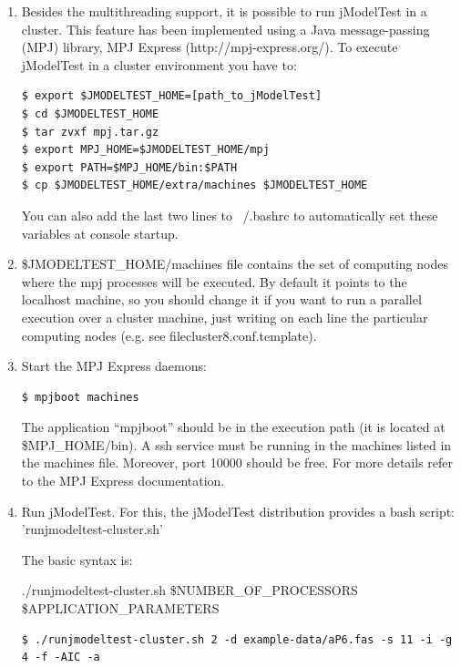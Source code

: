 \begin{enumerate}
\item Besides the multithreading support, it is possible to run jModelTest in a cluster. This feature has been implemented using a Java message-passing (MPJ) library, MPJ Express (http://mpj-express.org/). To execute jModelTest in a cluster environment you have to:

\begin{lstlisting}
$ export $JMODELTEST_HOME=[path_to_jModelTest]
$ cd $JMODELTEST_HOME
$ tar zvxf mpj.tar.gz
$ export MPJ_HOME=$JMODELTEST_HOME/mpj
$ export PATH=$MPJ_HOME/bin:$PATH
$ cp $JMODELTEST_HOME/extra/machines $JMODELTEST_HOME
\end{lstlisting}

You can also add the last two lines to ~/.bashrc to automatically set these variables at console startup.

\item \$JMODELTEST\_HOME/machines file contains the set of computing nodes where the mpj processes will be executed. By default it points to the localhost machine, so you should change it if you want to run a parallel execution over a cluster machine, just writing on each line the particular computing nodes (e.g. see filecluster8.conf.template).

\item Start the MPJ Express daemons:

\begin{lstlisting}
$ mpjboot machines
\end{lstlisting}

The application ``mpjboot'' should be in the execution path (it is located at \$MPJ\_HOME/bin). A ssh service must be running in the machines listed in the machines file. Moreover, port 10000 should be free. For more details refer to the MPJ Express documentation.

\item Run jModelTest. For this, the jModelTest distribution provides a bash script: 'runjmodeltest-cluster.sh'

The basic syntax is:

./runjmodeltest-cluster.sh \$NUMBER\_OF\_PROCESSORS \$APPLICATION\_PARAMETERS

\begin{lstlisting}
$ ./runjmodeltest-cluster.sh 2 -d example-data/aP6.fas -s 11 -i -g 4 -f -AIC -a
\end{lstlisting}

\end{enumerate}
